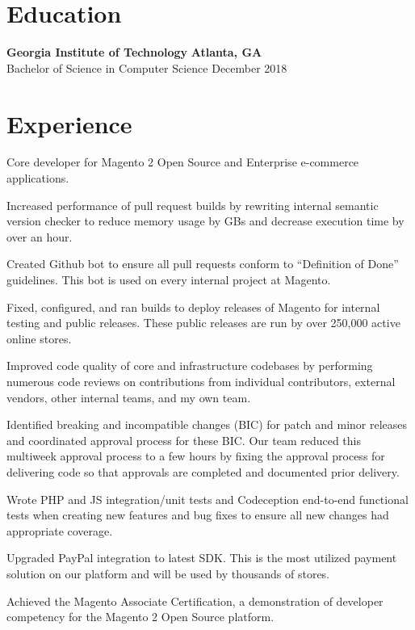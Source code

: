 \documentclass[line]{resume}
\begin{document}
\begin{center}
\end{center}
\vspace{-9px}
\section{Education}
\textbf{Georgia Institute of Technology} \hfill \textbf{Atlanta, GA} \\
Bachelor of Science in Computer Science  \hfill December 2018

\vspace{-3px}
\section{Experience}
\vspace{-1px}

\begin{myitemize}
	\item Core developer for Magento 2 Open Source and Enterprise e-commerce applications.
	\item Increased performance of pull request builds by rewriting internal semantic version checker to reduce memory usage by GBs and decrease execution time by over an hour.
	\item Created Github bot to ensure all pull requests conform to ``Definition of Done'' guidelines. This bot is used on every internal project at Magento.
	\item Fixed, configured, and ran builds to deploy releases of Magento for internal testing and public releases. These public releases are run by over 250,000 active online stores.
	\item Improved code quality of core and infrastructure codebases by performing numerous code reviews on contributions from individual contributors, external vendors, other internal teams, and my own team.
	\item Identified breaking and incompatible changes (BIC) for patch and minor releases and coordinated approval process for these BIC. Our team reduced this multiweek approval process to a few hours by fixing the approval process for delivering code so that approvals are completed and documented prior delivery.
	\item Wrote PHP and JS integration/unit tests and Codeception end-to-end functional tests when creating new features and bug fixes to ensure all new changes had appropriate coverage.
	\item Upgraded PayPal integration to latest SDK. This is the most utilized payment solution on our platform and will be used by thousands of stores.
	\item Achieved the Magento Associate Certification, a demonstration of developer competency for the Magento 2 Open Source platform.
\end{myitemize}
\end{document}
